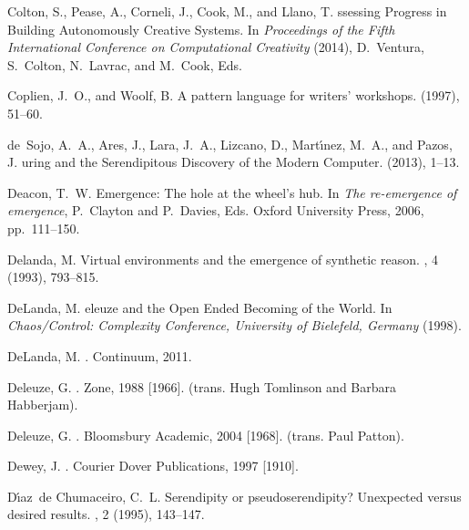 \begin{thebibliography}{10}
{\sc Colton, S., Pease, A., Corneli, J., Cook, M., and Llano, T.}
ssessing {P}rogress in {B}uilding {A}utonomously {C}reative
  {S}ystems.
\newblock In {\em Proceedings of the Fifth International Conference on
  Computational Creativity\/} (2014), D.~Ventura, S.~Colton, N.~Lavrac, and
  M.~Cook, Eds.

{\sc Coplien, J.~O., and Woolf, B.}
\newblock A pattern language for writers' workshops.
 (1997), 51--60.

{\sc de~Sojo, A.~A., Ares, J., Lara, J.~A., Lizcano, D., Mart{\'\i}nez, M.~A.,
  and Pazos, J.}
uring and the {S}erendipitous {D}iscovery of the {M}odern
  {C}omputer.
 (2013), 1--13.

{\sc Deacon, T.~W.}
\newblock Emergence: {T}he hole at the wheel{'}s hub.
\newblock In {\em The re-emergence of emergence}, P.~Clayton and P.~Davies,
  Eds. Oxford University Press, 2006, pp.~111--150.

{\sc Delanda, M.}
\newblock Virtual environments and the emergence of synthetic reason.
, 4 (1993), 793--815.

{\sc DeLanda, M.}
eleuze and the {O}pen {E}nded {B}ecoming of the {W}orld.
\newblock In {\em {C}haos/{C}ontrol: {C}omplexity {C}onference, {U}niversity of
  {B}ielefeld, {G}ermany\/} (1998).

{\sc DeLanda, M.}
.
\newblock Continuum, 2011.

{\sc Deleuze, G.}
.
\newblock Zone, 1988 [1966].
\newblock (trans. Hugh Tomlinson and Barbara Habberjam).

{\sc Deleuze, G.}
.
\newblock Bloomsbury Academic, 2004 [1968].
\newblock (trans. Paul Patton).

{\sc Dewey, J.}
.
\newblock Courier Dover Publications, 1997 [1910].

{\sc D{\'{\i}}az~de Chumaceiro, C.~L.}
\newblock Serendipity or pseudoserendipity? {U}nexpected versus desired
  results.
, 2 (1995), 143--147.


\end{thebibliography}
